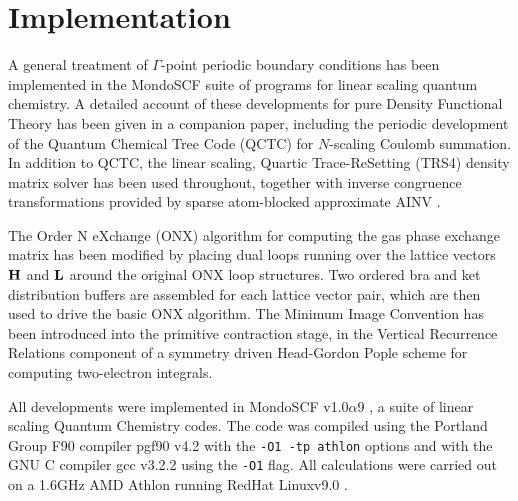 \documentclass[prb,aps,nobibnotes,twocolumn,doublespace,twocolumngrid,superbib,showpacs]{revtex4}
\begin{document}

\section{Implementation}\label{implementation}

A general treatment of $\Gamma$-point periodic boundary conditions has been implemented in the {\sc MondoSCF}\cite{MondoSCF}
suite of programs for linear scaling quantum chemistry.  A detailed account of these developments for 
pure Density Functional Theory has been given in a companion paper\cite{CTymczak04A}, including the periodic 
development of the Quantum Chemical Tree Code ({\sc QCTC}) for $N$-scaling Coulomb summation.  In addition to QCTC, 
the linear scaling, Quartic Trace-ReSetting ({\sc TRS4}) \cite{ANiklasson03} density matrix solver has been used throughout, 
together with inverse congruence transformations provided by sparse atom-blocked approximate {\sc AINV} \cite{MBenzi01}.  

The Order N eXchange ({\sc ONX}) algorithm \cite{ESchwegler97} for computing the gas phase exchange matrix 
has been modified by placing dual loops running over the lattice vectors 
${\bf H}$ and ${\bf L}$ around the original ONX loop structures.  Two ordered bra and ket distribution 
buffers are assembled for each lattice vector pair, which are then used to drive the basic {\sc ONX} algorithm.
The Minimum Image Convention has been introduced into the primitive contraction stage, in the 
Vertical Recurrence Relations component of a symmetry driven Head-Gordon Pople \cite{MHeadgordon88} scheme for 
computing two-electron integrals.  

All developments  were implemented in  {\sc MondoSCF} v1.0$\alpha$9 \cite{MondoSCF}, a suite of 
linear scaling Quantum Chemistry codes.  The code was compiled using the Portland 
Group F90 compiler {\sc pgf90} v4.2 \cite{pgf90} with the {\tt -O1 -tp athlon} options  and with the 
GNU C compiler {\sc gcc} v3.2.2 using the {\tt -O1} flag.  All calculations were carried out on a 
1.6GHz AMD Athlon running RedHat  {\sc Linux}v9.0 \cite{RedHat90}.   
\end{document}
